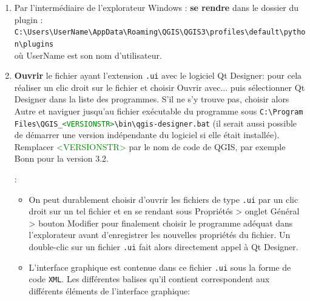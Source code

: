 \documentclass[11pt]{article}
\begin{document}
\begin{enumerate}\itemsep0.4em
\item Par l'intermédiaire de l'explorateur Windows : \textbf{se rendre} dans le dossier du plugin :\\
\texttt{C:\textbackslash{}Users\textbackslash{}\textcolor{mygreen}{UserName}\textbackslash{}AppData\textbackslash{}Roaming\textbackslash{}QGIS\textbackslash{}QGIS3\textbackslash{}profiles\textbackslash{}default\textbackslash{}python\textbackslash{}plugins}\\
où \textcolor{mygreen}{UserName} est son nom d'utilisateur.


\item \textbf{Ouvrir} le fichier ayant l'extension \og{}\texttt{.ui}\fg{} avec le logiciel \og{}Qt Designer\fg{}: pour cela réaliser un clic droit sur le fichier et choisir \og{}Ouvrir avec...\fg{} puis sélectionner \og{}Qt Designer\fg{} dans la liste des programmes. S'il ne s'y trouve pas, choisir alors \og{}Autre\fg{} et naviguer jusqu'au fichier exécutable du programme sous \texttt{C:\textbackslash{}Program Files\textbackslash{}QGIS\_\textcolor{green}{<VERSIONSTR>}\textbackslash{}bin\textbackslash{}qgis-designer.bat} (il serait aussi possible de démarrer une version indépendante du logiciel si elle était installée). Remplacer \textcolor{green}{<VERSIONSTR>} par le nom de code de QGIS, par exemple \og{}Bonn\fg{} pour la version 3.2.

\underline{}: \vspace*{0.4em}
\begin{itemize}\itemsep0.4em
\renewcommand\labelitemi{\---}
\item On peut durablement choisir d'ouvrir les fichiers de type \og{}\texttt{.ui}\fg{} par un clic droit sur un tel fichier et en se rendant sous \og{}Propriétés\fg{} > onglet \og{}Général\fg{} > bouton \og{}Modifier\fg{} pour finalement choisir le programme adéquat dans l'explorateur avant d'enregistrer les nouvelles propriétés du fichier. Un double-clic sur un fichier \og{}\texttt{.ui}\fg{} fait alors directement appel à \og{}Qt Designer\fg{}.


\item L'interface graphique est contenue dans ce fichier \og{}\texttt{.ui}\fg{} sous la forme de code \texttt{XML}. Les différentes balises qu'il contient correspondent aux différents éléments de l'interface graphique:


\end{itemize}
\end{enumerate}
\end{document}
